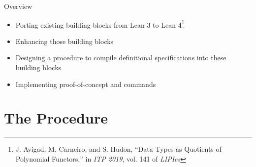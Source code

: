 \documentclass[t,12pt]{beamer}
\begin{document}

\begin{frame}{Overview}
    \begin{itemize}
        \setlength{\itemsep}{\fill}

        \item Porting existing building blocks from Lean 3 to Lean 4\footnote{J. Avigad, M. Carneiro, and S. Hudon, “Data Types as Quotients of Polynomial Functors,”
        in \emph{ITP 2019}, vol. 141 of \emph{LIPIcs}}

        \item Enhancing those building blocks
        
        \item Designing a procedure to compile definitional specifications into these building blocks
        
        \item Implementing proof-of-concept \data{} and \codata{} commands
    \end{itemize}

    \vfill
     
\end{frame}





\section*{The Procedure}








        
\end{document}
